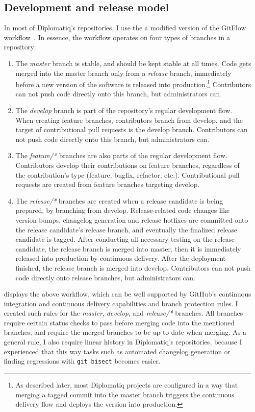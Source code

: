 \subsection{Development and release model}

In most of Diplomatiq's repositories, I use the a modified version of the GitFlow workflow~\cite{gitflow}. In essence, the workflow operates on four types of branches in a repository:

\begin{enumerate}
\item The \emph{master} branch is stable, and should be kept stable at all times. Code gets merged into the master branch only from a \emph{release} branch, immediately before a new version of the software is released into production.\footnote{As described later, most Diplomatiq projects are configured in a way that merging a tagged commit into the master branch triggers the continuous delivery flow and deploys the version into production.} Contributors can not push code directly onto this branch, but administrators can.
\item The \emph{develop} branch is part of the repository's regular development flow. When creating feature branches, contributors branch from develop, and the target of contributional pull requests is the develop branch. Contributors can not push code directly onto this branch, but administrators can.
\item The \emph{feature/*} branches are also parts of the regular development flow. Contributors develop their contributions on feature branches, regardless of the contribution's type (feature, bugfix, refactor, etc.). Contributional pull requests are created from feature branches targeting develop.
\item The \emph{release/*} branches are created when a release candidate is being prepared, by branching from develop. Release-related code changes like version bumps, changelog generation and release hotfixes are committed onto the release candidate's release branch, and eventually the finalized release candidate is tagged. After conducting all necessary testing on the release candidate, the release branch is merged into master, then it is immediately released into production by continuous delivery. After the deployment finished, the release branch is merged into develop. Contributors can not push code directly onto release branches, but administrators can.
\end{enumerate}

 displays the above workflow, which can be well supported by GitHub's continuous integration and continuous delivery capabilities and branch protection rules. I created such rules for the \emph{master}, \emph{develop}, and \emph{release/*} branches. All branches require certain status checks to pass before merging code into the mentioned branches, and require the merged branches to be up to date when merging. As a general rule, I also require linear history in Diplomatiq's repositories, because I experienced that this way tasks such as automated changelog generation or finding regressions with \lstinline{git bisect} becomes easier.

